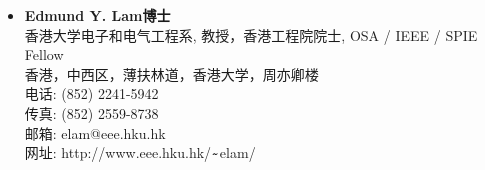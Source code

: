 \documentclass[10pt,a4paper]{moderncv}
\begin{document}
\begin{itemize}
\item \textbf{Edmund Y. Lam博士}\\
  香港大学电子和电气工程系, 教授，香港工程院院士, OSA / IEEE / SPIE Fellow\\
  香港，中西区，薄扶林道，香港大学，周亦卿楼 \\
  电话: (852) 2241-5942 \\
  传真: (852) 2559-8738 \\
  邮箱: elam@eee.hku.hk  \\
  网址: {http://www.eee.hku.hk/$\verb+~+$elam/}
\end{itemize}
\vspace{3pt}



\end{document}

